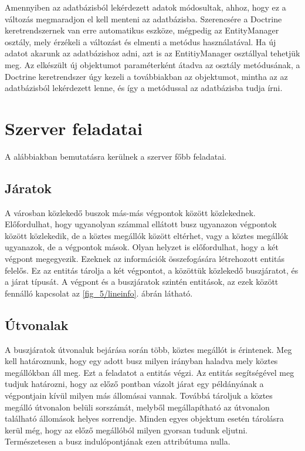 Amennyiben az adatbázisból lekérdezett adatok módosultak, ahhoz, hogy ez a változás megmaradjon el kell menteni az adatbázisba. 
Szerencsére a Doctrine keretrendszernek van erre automatikus eszköze, mégpedig az EntityManager osztály, mely érzékeli a változást és elmenti a  metódus használatával. 
Ha új adatot akarunk az adatbázishoz adni, azt is az EntitiyManager osztállyal tehetjük meg. 
Az elkészült új objektumot paraméterként átadva az osztály  metódusának, a Doctrine keretrendszer úgy kezeli a továbbiakban az objektumot, mintha az az adatbázisból lekérdezett lenne, és így a  metódussal az adatbázisba tudja írni. 

\section{Szerver feladatai}
\label{serverjob}

A alábbiakban bemutatásra kerülnek a szerver főbb feladatai.

\subsection*{Járatok}
\label{lineinfodetails}

A városban közlekedő buszok más-más végpontok között közlekednek. 
Előfordulhat, hogy ugyanolyan számmal ellátott busz ugyanazon végpontok között közlekedik, de a köztes megállók között eltérhet, vagy a köztes megállók ugyanazok, de a végpontok mások. 
Olyan helyzet is előfordulhat, hogy a két végpont megegyezik. 
Ezeknek az információk összefogására létrehozott  entitás felelős. 
Ez az entitás tárolja a két végpontot, a közöttük közlekedő buszjáratot, és a járat típusát. 
A végpont és a buszjáratok szintén entitások, az ezek között fennálló kapcsolat az \ref{fig_5/lineinfo}. ábrán látható. 


\subsection*{Útvonalak}
\label{linehasstationsdetails}

A buszjáratok útvonaluk bejárása során több, köztes megállót is érintenek. 
Meg kell határoznunk, hogy egy adott busz milyen irányban haladva mely köztes megállókban áll meg. 
Ezt a feladatot a  entitás végzi. 
Az entitás segítségével meg tudjuk határozni, hogy az előző pontban vázolt járat egy példányának a végpontjain kívül milyen más állomásai vannak. 
Továbbá tároljuk a köztes megálló útvonalon belüli sorszámát, melyből megállapítható az útvonalon található állomások helyes sorrendje. 
Minden egyes objektum esetén tárolásra kerül még, hogy az előző megállóból milyen gyorsan tudunk eljutni. 
Természetesen a busz indulópontjának ezen attribútuma nulla. 

